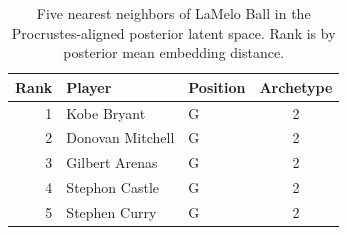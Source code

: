 \begin{table}[htbp]
  \centering\small
  \begin{tabular}{rllc}
    \toprule
    Rank & Player & Position & Archetype \\
    \midrule
    1 & Kobe Bryant & G & 2 \\
    2 & Donovan Mitchell & G & 2 \\
    3 & Gilbert Arenas & G & 2 \\
    4 & Stephon Castle & G & 2 \\
    5 & Stephen Curry & G & 2 \\
    \bottomrule
  \end{tabular}
  \caption{Five nearest neighbors of LaMelo Ball in the Procrustes-aligned posterior latent space. Rank is by posterior mean embedding distance.}
  \label{tab:LaMelo_Ball_neighbors}
\end{table}

